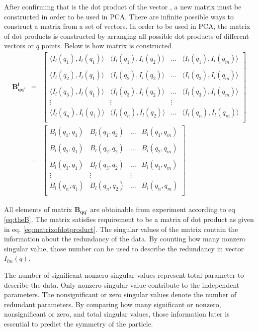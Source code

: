 After confirming that \Blq is the dot product of the vector \Ilm, a new matrix must be constructed in order to be used in PCA. There are infinite possible ways to construct a matrix from a set of vectors. In order to be used in PCA, the matrix of dot products is constructed by arranging all possible dot products of different vectors or $q$ points. Below is how matrix is constructed
\begin{eqnarray}
\mathbf{B_{qq'}^{l}} &=& 
\begin{bmatrix}
\langle I_{l}(q_1), I_{l}(q_1)\rangle & \langle I_{l}(q_1),I_{l}(q_2) \rangle & \ldots & \langle I_{l}(q_1),I_{l}(q_m) \rangle \\
& & \\
\langle I_{l}(q_2), I_{l}(q_1)\rangle & \langle I_{l}(q_2),I_{l}(q_2) \rangle & \ldots & \langle I_{l}(q_2),I_{l}(q_m) \rangle \\
& &\\
\langle I_{l}(q_3), I_{l}(q_1)\rangle & \langle I_{l}(q_3),I_{l}(q_2) \rangle & \ldots & \langle I_{l}(q_3),I_{l}(q_m) \rangle \\
\vdots & \vdots & \vdots \\
\langle I_{l}(q_n), I_{l}(q_1)\rangle & \langle I_{l}(q_n),I_{l}(q_2) \rangle & \ldots & \langle I_{l}(q_n),I_{l}(q_m) \rangle \\
\end{bmatrix}
\\
&=&
\begin{bmatrix}
B_{l}(q_1,q_1) &B_{l}(q_1,q_2)& \ldots& B_{l}(q_1,q_m) \\
& & \\
B_{l}(q_2,q_1) &B_{l}(q_2,q_2)& \ldots& B_{l}(q_2,q_m) \\
& &\\
B_{l}(q_3,q_1) &B_{l}(q_3,q_2)& \ldots& B_{l}(q_3,q_m) \\
\vdots & \vdots & \vdots \\
B_{l}(q_n,q_1) &B_{l}(q_n,q_2)& \ldots& B_{l}(q_n,q_m) \\
\end{bmatrix}
\end{eqnarray}

All elements of matrix $\mathbf{B_{qq'}}$ are obtainable from experiment according to eq \ref{eq:theB}. The matrix satisfies requirement to be a matrix of dot product as given in eq. \ref{eq:matrixofdotproduct}. The singular values of the matrix contain the information about the redundancy of the data. By counting how many nonzero singular value, those number can be used to describe the redundancy in vector $I_{lm}(q)$. 

The number of significant nonzero singular values represent total parameter to describe the data. Only nonzero singular value contribute to the independent parameters. The nonsignificant or zero singular values denote the number of redundant parameters. By comparing how many significant or nonzero, nonsignificant or zero, and total singular values, those information later is essential to predict the symmetry of the particle. 
%
